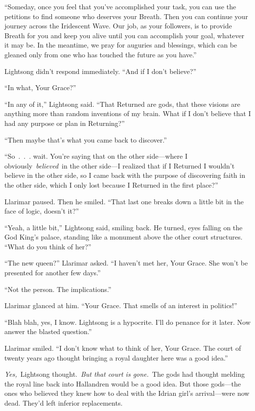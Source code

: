 “Someday, once you feel that you’ve accomplished your task, you can use the petitions to find someone who deserves your Breath. Then you can continue your journey across the Iridescent Wave. Our job, as your followers, is to provide Breath for you and keep you alive until you can accomplish your goal, whatever it may be. In the meantime, we pray for auguries and blessings, which can be gleaned only from one who has touched the future as you have.”

Lightsong didn’t respond immediately. “And if I don’t believe?”

“In what, Your Grace?”

“In any of it,” Lightsong said. “That Returned are gods, that these visions are anything more than random inventions of my brain. What if I don’t believe that I had any purpose or plan in Returning?”

“Then maybe that’s what you came back to discover.”

“So~.~.~. wait. You’re saying that on the other side—where I obviously~\textit{believed}~in the other side—I realized that if I Returned I wouldn’t believe in the other side, so I came back with the purpose of discovering faith in the other side, which I only lost because I Returned in the first place?”

Llarimar paused. Then he smiled. “That last one breaks down a little bit in the face of logic, doesn’t it?”

“Yeah, a little bit,” Lightsong said, smiling back. He turned, eyes falling on the God King’s palace, standing like a monument above the other court structures. “What do you think of her?”

“The new queen?” Llarimar asked. “I haven’t met her, Your Grace. She won’t be presented for another few days.”

“Not the person. The implications.”

Llarimar glanced at him. “Your Grace. That smells of an interest in politics!”

“Blah blah, yes, I know. Lightsong is a hypocrite. I’ll do penance for it later. Now answer the blasted question.”

Llarimar smiled. “I don’t know what to think of her, Your Grace. The court of twenty years ago thought bringing a royal daughter here was a good idea.”

\textit{Yes,}~Lightsong thought.~\textit{But that court is gone.}~The gods had thought melding the royal line back into Hallandren would be a good idea. But those gods—the ones who believed they knew how to deal with the Idrian girl’s arrival—were now dead. They’d left inferior replacements.

